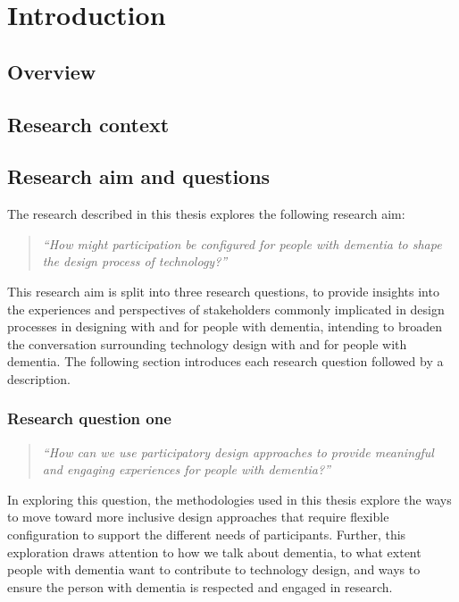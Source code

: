 \chapter{Introduction}

\section{Overview}
\label{Intro: Overiew}

\section{Research context}
\label{Intro: ResearchContext}

\section{Research aim and questions}
\label{Intro:RQ}
The research described in this thesis explores the following research aim:
\begin{quote}
    \textit{``How might participation be configured for people with dementia to shape the design process of technology?''}
\end{quote}
This research aim is split into three research questions, to provide insights into the experiences and perspectives of stakeholders commonly implicated in design processes in designing with and for people with dementia, intending to broaden the conversation surrounding technology design with and for people with dementia. The following section introduces each research question followed by a description.

\subsection{Research question one}
\label{RQ1}
\begin{quote}
\textit{``How can we use participatory design approaches to provide meaningful and engaging experiences for people with dementia?''}
\end{quote}
In exploring this question, the methodologies used in this thesis explore the ways to move toward more inclusive design approaches that require flexible configuration to support the different needs of participants. Further, this exploration draws attention to how we talk about dementia, to what extent people with dementia want to contribute to technology design, and ways to ensure the person with dementia is respected and engaged in research.

